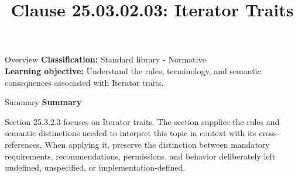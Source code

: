 \documentclass[10pt,letterpaper]{article}
\title{Clause 25.03.02.03: Iterator Traits}
\author{}
\date{}
\begin{document}
\maketitle
\begin{CornellOverviewBox}{Overview}
\textbf{Classification:} Standard library - Normative\\[2pt]
\textbf{Learning objective:} Understand the rules, terminology, and semantic consequences associated with Iterator traits.
\end{CornellOverviewBox}\begin{CornellSummaryBox}{Summary}
{\sffamily\bfseries\color{Accent} Summary}\par\vspace{3pt}Section 25.3.2.3 focuses on Iterator traits. The section supplies the rules and semantic distinctions needed to interpret this topic in context with its cross-references. When applying it, preserve the distinction between mandatory requirements, recommendations, permissions, and behavior deliberately left undefined, unspecified, or implementation-defined.
\end{CornellSummaryBox}
\end{document}
